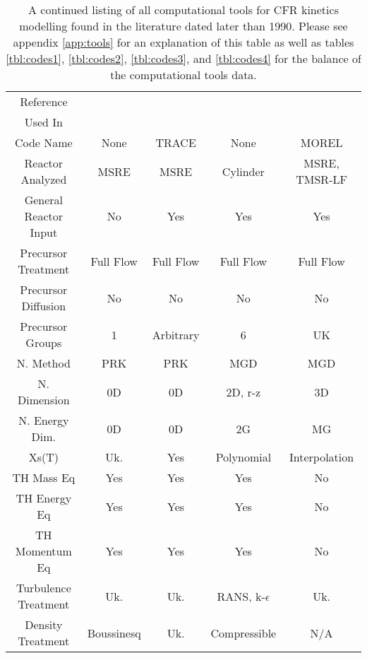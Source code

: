 \documentclass[review]{elsarticle}
\begin{document}
\begin{appendices}
\begin{landscape}
\begin{table}[H]
    \caption{A continued listing of all computational tools for CFR kinetics modelling
        found in the literature dated later than 1990. Please see appendix
        \ref{app:tools} for an explanation of this table as well as tables
        \ref{tbl:codes1}, \ref{tbl:codes2}, \ref{tbl:codes3}, and
        \ref{tbl:codes4} for the balance of the computational tools data.}
    \label{tbl:codes5}
    \begin{center}
        \begin{tabular}{|c c c c c|}
            \hline
            Reference &
                \cite{zanetti_development_2016} &
                \cite{zanetti_extension_2015} &
                \cite{zhang_development_2009-1} &
                \cite{zhuang_studies_2015} \\
                Used In & & & \cite{zhang_analysis_2009} &
                    \cite{zheng_development_2014} \\
                Code Name & None & TRACE & None & MOREL\\
                Reactor Analyzed & MSRE & MSRE & Cylinder & MSRE, TMSR-LF\\
                General Reactor Input & No & Yes & Yes & Yes \\
                Precursor Treatment & Full Flow & Full Flow & Full Flow &
                    Full Flow \\
                Precursor Diffusion & No & No & No & No \\
                Precursor Groups & 1 & Arbitrary & 6 & UK \\
                N. Method & PRK & PRK & MGD & MGD\\
                N. Dimension & 0D & 0D & 2D, r-z & 3D\\
                N. Energy Dim. & 0D & 0D & 2G & MG\\
                Xs(T) & Uk. & Yes & Polynomial & Interpolation\\
                TH Mass Eq & Yes & Yes & Yes & No\\
                TH Energy Eq & Yes & Yes & Yes & No\\
                TH Momentum Eq & Yes & Yes & Yes & No\\
                Turbulence Treatment & Uk. & Uk. & RANS, k-$\epsilon$ & Uk.\\
                Density Treatment & Boussinesq & Uk. & Compressible & N/A\\

\end{tabular}
\end{center}
\end{table}
\end{landscape}
\end{appendices}
\end{document}

